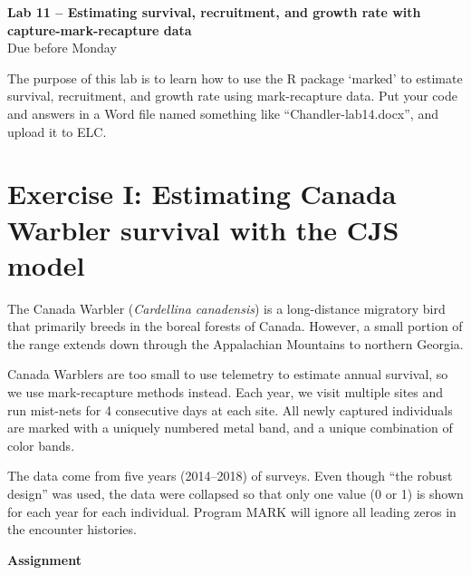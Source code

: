 \documentclass[12pt]{article}\usepackage[]{graphicx}\usepackage[]{color}
\begin{document}
{
  \Large
  \centering
  {\bf Lab 11 -- Estimating survival, recruitment, and growth rate
    with capture-mark-recapture data} \\
  Due before Monday \\
}

\vspace{10pt}

The purpose of this lab is to learn how to use the R package `marked' to
estimate survival, recruitment, and growth rate using mark-recapture
data. Put your code and answers in a Word file named something like
``Chandler-lab14.docx'', and upload it to ELC.



\section*{\large Exercise I: Estimating Canada Warbler survival with the CJS model}



The Canada Warbler ({\it Cardellina canadensis}) is a long-distance
migratory bird that primarily breeds in the boreal forests of
Canada. However, a small portion of the range extends down through the
Appalachian Mountains to northern Georgia.

Canada Warblers are too small to use telemetry to estimate annual
survival, so we use mark-recapture methods instead. Each year, we
visit multiple sites and run mist-nets for 4 consecutive days at each
site. All newly captured individuals are marked with a uniquely
numbered metal band, and a unique combination of color bands.

The data come from five years (2014--2018) of surveys. Even though
``the robust design'' was used, the data were collapsed so that only
one value (0 or 1) is shown for each year for each individual. Program
MARK will ignore all leading zeros in the encounter histories.

{\bf Assignment}
\end{document}
